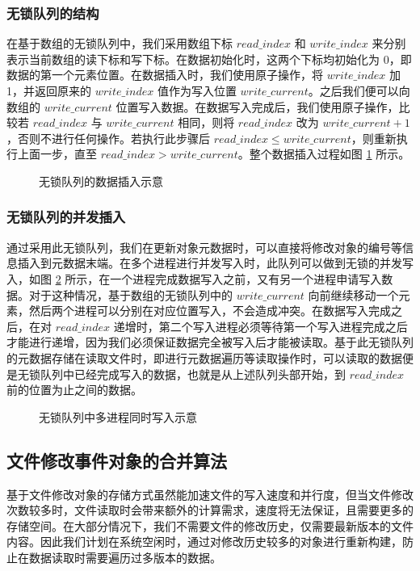 \subsubsection{无锁队列的结构}
在基于数组的无锁队列中，我们采用数组下标 $read\_index$ 和 $write\_index$ 来分别表示当前数组的读下标和写下标。在数据初始化时，这两个下标均初始化为 0，即数据的第一个元素位置。在数据插入时，我们使用原子操作，将 $write\_index$ 加 1，并返回原来的 $write\_index$ 值作为写入位置 $write\_current$。之后我们便可以向数组的 $write\_current$ 位置写入数据。在数据写入完成后，我们使用原子操作，比较若 $read\_index$ 与 $write\_current$ 相同，则将 $read\_index$ 改为 $write\_current+1$，否则不进行任何操作。若执行此步骤后 $read\_index \leq write\_current$，则重新执行上面一步，直至 $read\_index>write\_current$。整个数据插入过程如图 \ref{p19} 所示。

\begin{figure}[!htb]
\centering
\resizebox{.8\textwidth}{!}{}
\caption{无锁队列的数据插入示意}
\label{p19}
\end{figure}
\subsubsection{无锁队列的并发插入}
通过采用此无锁队列，我们在更新对象元数据时，可以直接将修改对象的编号等信息插入到元数据末端。在多个进程进行并发写入时，此队列可以做到无锁的并发写入，如图 \ref{p20} 所示，在一个进程完成数据写入之前，又有另一个进程申请写入数据。对于这种情况，基于数组的无锁队列中的 $write\_current$ 向前继续移动一个元素，然后两个进程可以分别在对应位置写入，不会造成冲突。在数据写入完成之后，在对 $read\_index$ 递增时，第二个写入进程必须等待第一个写入进程完成之后才能进行递增，因为我们必须保证数据完全被写入后才能被读取。基于此无锁队列的元数据存储在读取文件时，即进行元数据遍历等读取操作时，可以读取的数据便是无锁队列中已经完成写入的数据，也就是从上述队列头部开始，到 $read\_index$ 前的位置为止之间的数据。

\begin{figure}[!htb]
\centering
\resizebox{.8\textwidth}{!}{}
\caption{无锁队列中多进程同时写入示意}
\label{p20}
\end{figure}
\subsection{文件修改事件对象的合并算法}
基于文件修改对象的存储方式虽然能加速文件的写入速度和并行度，但当文件修改次数较多时，文件读取时会带来额外的计算需求，速度将无法保证，且需要更多的存储空间。在大部分情况下，我们不需要文件的修改历史，仅需要最新版本的文件内容。因此我们计划在系统空闲时，通过对修改历史较多的对象进行重新构建，防止在数据读取时需要遍历过多版本的数据。
